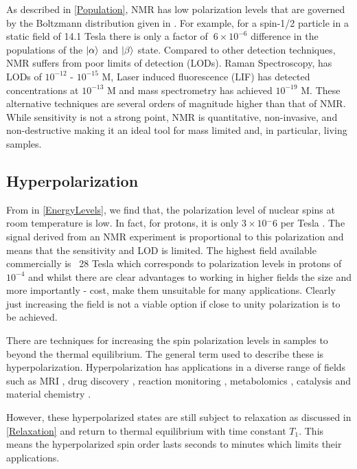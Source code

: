 As described in \ref{Population}, NMR has low polarization levels that are governed by the Boltzmann
distribution given in . For example, for a spin-1/2 particle in a static field of 14.1 Tesla
there is only a factor of $~6\times10^{-6}$ difference in the populations of the $\ket{\alpha}$ and $\ket{\beta}$ state.
Compared to other detection techniques, NMR suffers from poor limits of detection (LODs). Raman Spectroscopy, has
LODs of $10^{-12}$ - $10^{-15}$ M, Laser induced fluorescence (LIF) has detected concentrations at $10^{-13}$ M and
mass spectrometry has achieved $10^{-19}$ M. These alternative techniques are several orders of magnitude higher than that of NMR.
While sensitivity is not a strong point, NMR is quantitative, non-invasive, and non-destructive making it an ideal
tool for mass limited and, in particular, living samples.

\subsection{Hyperpolarization}

 From  in \ref{EnergyLevels}, we find that, the polarization level of nuclear spins at room temperature is low. In fact,
 for protons, it is only $3\times10{^-6}$ per Tesla \citep{RN138}. The signal derived from an NMR experiment
 is proportional to this polarization and means that the sensitivity and LOD is limited. The highest
 field available commercially is ~28 Tesla which corresponds to polarization levels in protons of ~$10^{-4}$ and
 whilst there are clear advantages to working in higher fields the size and more importantly - cost, make them
 unsuitable for many applications. Clearly just increasing the field is not a viable
 option if close to unity polarization is to be
 achieved.

 There are techniques for increasing the spin polarization levels in samples to beyond the thermal
 equilibrium. The general term used to describe these is hyperpolarization. Hyperpolarization has
 applications in a diverse range of fields such as MRI \citep{RN139,RN140,RN151,RN152}, drug discovery
 \citep{RN141,RN142}, reaction monitoring \citep{RN143,RN144,RN145}, metabolomics \citep{RN147,RN148},
 catalysis\citep{RN149, RN150} and material chemistry \citep{RN153,piveteau2015structure,RN154}.

 However, these hyperpolarized states are still subject to relaxation as discussed in \ref{Relaxation} and
 return to thermal equilibrium with time constant $T_1$. This means the hyperpolarized spin order lasts seconds
 to minutes which limits their applications.

